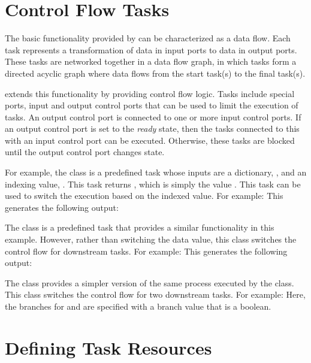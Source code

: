 \section{Control Flow Tasks}

The basic functionality provided by \pwsp can be characterized as
a data flow.  Each task represents a transformation of data in input
ports to data in output ports.  These tasks are networked together
in a data flow graph, in which tasks form a directed acyclic graph
where data flows from the start task(s) to the final task(s).

\pwsp extends this functionality by providing control flow logic.
Tasks include special ports, input and output control ports that
can be used to limit the execution of tasks.  An output control
port is connected to one or more input control ports.  If an output
control port is set to the \textit{ready} state, then the tasks
connected to this with an input control port can be executed.
Otherwise, these tasks are blocked until the output control port
changes state.

For example, the  class is a predefined task
whose inputs are a dictionary, , and an indexing value,
.  This task returns , which is simply
the value .  This task can be used to switch 
the execution based on the indexed value.  For example:
This generates the following output:

The  class is a predefined task that provides a similar 
functionality in this example.  However, rather than switching the data value, this class
switches the control flow for downstream tasks.  For example:
This generates the following output:

The  class provides a simpler version of the
same process executed by the  class.  This class
switches the control flow for two downstream tasks.  For example:
Here, the branches for  and  are specified
with a branch value that is a boolean.


\section{Defining Task Resources}

